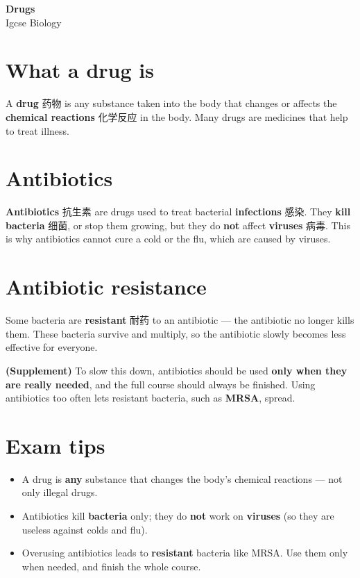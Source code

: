 \documentclass[11pt]{article}
\begin{document}
\begin{center}
  {\LARGE\bfseries Drugs}\\[0.35em]
  {\large Igcse Biology}
\end{center}
\vspace{0.6em}

\section*{What a drug is}

A \textbf{drug} 药物 is any substance taken into the body that changes or affects the \textbf{chemical reactions} 化学反应 in the body. Many drugs are medicines that help to treat illness.

\section*{Antibiotics}

\textbf{Antibiotics} 抗生素 are drugs used to treat bacterial \textbf{infections} 感染. They \textbf{kill bacteria} 细菌, or stop them growing, but they do \textbf{not} affect \textbf{viruses} 病毒. This is why antibiotics cannot cure a cold or the flu, which are caused by viruses.

\section*{Antibiotic resistance}

Some bacteria are \textbf{resistant} 耐药 to an antibiotic — the antibiotic no longer kills them. These bacteria survive and multiply, so the antibiotic slowly becomes less effective for everyone.

\textbf{(Supplement)} To slow this down, antibiotics should be used \textbf{only when they are really needed}, and the full course should always be finished. Using antibiotics too often lets resistant bacteria, such as \textbf{MRSA}, spread.

\section*{Exam tips}

\begin{itemize}
\item A drug is \textbf{any} substance that changes the body's chemical reactions — not only illegal drugs.

\item Antibiotics kill \textbf{bacteria} only; they do \textbf{not} work on \textbf{viruses} (so they are useless against colds and flu).

\item Overusing antibiotics leads to \textbf{resistant} bacteria like MRSA. Use them only when needed, and finish the whole course.

\end{itemize}
\end{document}
